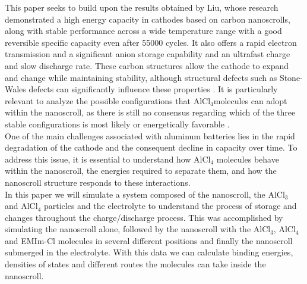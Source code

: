 \documentclass[aps,twocolumn,secnumarabic,nobalancelastpage,amsmath,amssymb,
nofootinbib,floatfix]{revtex4}
\begin{document}
This paper seeks to build upon the results obtained by Liu, whose research demonstrated a high energy capacity in cathodes based on carbon nanoscrolls, along with stable performance across a wide temperature range with a good reversible specific capacity even after 55000 cycles. It also offers a rapid electron transmission and a significant anion storage capability and an ultrafast charge and slow discharge rate. These carbon structures allow the cathode to expand and change while maintaining stability, although structural defects such as Stone-Wales defects can significantly influence these properties \cite{Jha2018Role,Tiwari2023Stone,Wang2013Catalytically}. It is particularly relevant to analyze the possible configurations that AlCl$_4$molecules can adopt within the nanoscroll, as there is still no consensus regarding which of the three stable configurations is most likely or energetically favorable \cite{liu2018carbon,Chen2022Formation,Lin2021FeatureRich}.\\
One of the main challenges associated with aluminum batteries lies in the rapid degradation of the cathode and the consequent decline in capacity over time. To address this issue, it is essential to understand how AlCl$_4$ molecules behave within the nanoscroll, the energies required to separate them, and how the nanoscroll structure responds to these interactions.\\
In this paper we will simulate  a system composed of the nanoscroll, the AlCl$_3$ and AlCl$_4$ particles and the electrolyte to understand the process of storage and changes throughout the charge/discharge process. This was accomplished by simulating the nanoscroll alone, followed by the nanoscroll with the AlCl$_3$, AlCl$_4$ and EMIm-Cl molecules in several different positions and finally the nanoscroll submerged in the electrolyte. With this data we can calculate binding energies, densities of states and different routes the molecules can take inside the nanoscroll.  \\
\end{document}

